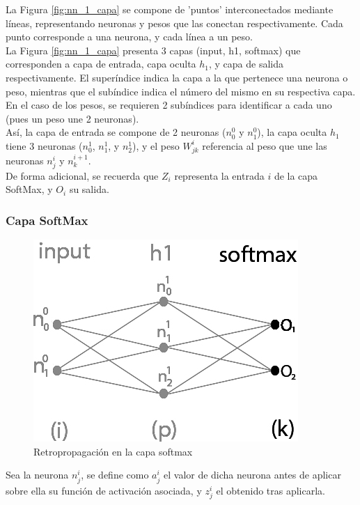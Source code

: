 La Figura \ref{fig:nn_1_capa} se compone de 'puntos' interconectados mediante líneas, representando neuronas y pesos que las conectan respectivamente. Cada punto corresponde a una neurona, y cada línea a un peso. \\
La Figura \ref{fig:nn_1_capa} presenta 3 capas (input, h1, softmax) que corresponden a capa de entrada, capa oculta $h_1$, y capa de salida respectivamente. El superíndice indica la capa a la que pertenece una neurona o peso, mientras que el subíndice indica el número del mismo en su respectiva capa. En el caso de los pesos, se requieren 2 subíndices para identificar a cada uno (pues un peso une 2 neuronas). \\
Así, la capa de entrada se compone de 2 neuronas ($n^{0}_0$ y $n^{0}_1$), la capa oculta $h_1$ tiene 3 neuronas ($n^1_{0}$, $n^1_{1}$, y $n^1_{2}$), y el peso $W^{i}_{jk}$ referencia al peso que une las neuronas $n^{i}_j$ y $n^{i+1}_k$.\\
De forma adicional, se recuerda que $Z_i$ representa la entrada $i$ de la capa SoftMax, y $O_i$ su salida.  

\subsubsection{Capa SoftMax}

\begin{figure}[H]
	\centering
	\includegraphics[scale=0.35]{imagenes/nn_1_capa_output.jpg}  
	\caption{Retropropagación en la capa softmax}
	\label{fig:nn_1_capa_output}
\end{figure}

Sea la neurona $n^i_j$, se define como $a^i_j$ el valor de dicha neurona antes de aplicar sobre ella su función de activación asociada, y $z^i_j$ el obtenido tras aplicarla. 

